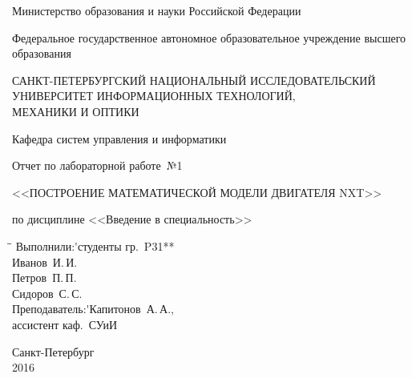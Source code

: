 \begin{titlepage}

\begin{center}
\large $\phantom{dirty trick}$

\vspace{0.2cm}

Министерство образования и науки Российской Федерации\\

\vspace{0.5cm}

Федеральное государственное автономное образовательное учреждение высшего образования

\vspace{0.5cm}

САНКТ-ПЕТЕРБУРГСКИЙ НАЦИОНАЛЬНЫЙ ИССЛЕДОВАТЕЛЬСКИЙ\\
УНИВЕРСИТЕТ ИНФОРМАЦИОННЫХ ТЕХНОЛОГИЙ,\\
МЕХАНИКИ И ОПТИКИ

\vspace{2.5cm}

Кафедра систем управления и информатики

\vspace{3.0cm}

Отчет по лабораторной работе~№1\\

\vspace{0.2cm}

<<ПОСТРОЕНИЕ МАТЕМАТИЧЕСКОЙ МОДЕЛИ ДВИГАТЕЛЯ NXT>>\\

\vspace{0.2cm}

по дисциплине <<Введение в специальность>>

\end{center}

\vspace{2.5cm}

{\large 
\begin{tabbing}
\hspace{12.5cm}\=\hspace{0.3cm}\=\+\kill
Выполнили:\'\>студенты гр.~P31**\+\\
Иванов~И.\,И.\\
Петров~П.\,П.\\
Сидоров~С.\,С.\-\\[\medskipamount]
Преподаватель:\'\>Капитонов~А.\,А.,\+\\
ассистент каф.~СУиИ
\end{tabbing}

}
\vspace{\fill}

\begin{center}
\large
Санкт-Петербург\\2016
\end{center}
\end{titlepage}